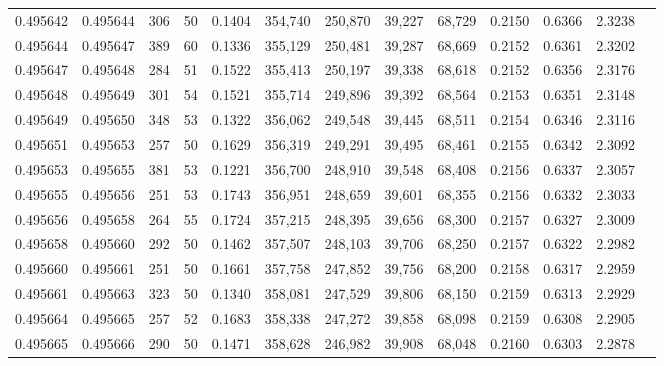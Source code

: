 \begin{tabular}{rrrrrrrrrrrrr}
0.495642 & 0.495644 &   306 &  50 &                                     0.1404 & 354,740 & 250,870 &  39,227 &  68,729 & 0.2150 & 0.6366 & 2.3238 \\
0.495644 & 0.495647 &   389 &  60 &                                     0.1336 & 355,129 & 250,481 &  39,287 &  68,669 & 0.2152 & 0.6361 & 2.3202 \\
0.495647 & 0.495648 &   284 &  51 &                                     0.1522 & 355,413 & 250,197 &  39,338 &  68,618 & 0.2152 & 0.6356 & 2.3176 \\
0.495648 & 0.495649 &   301 &  54 &                                     0.1521 & 355,714 & 249,896 &  39,392 &  68,564 & 0.2153 & 0.6351 & 2.3148 \\
0.495649 & 0.495650 &   348 &  53 &                                     0.1322 & 356,062 & 249,548 &  39,445 &  68,511 & 0.2154 & 0.6346 & 2.3116 \\
0.495651 & 0.495653 &   257 &  50 &                                     0.1629 & 356,319 & 249,291 &  39,495 &  68,461 & 0.2155 & 0.6342 & 2.3092 \\
0.495653 & 0.495655 &   381 &  53 &                                     0.1221 & 356,700 & 248,910 &  39,548 &  68,408 & 0.2156 & 0.6337 & 2.3057 \\
0.495655 & 0.495656 &   251 &  53 &                                     0.1743 & 356,951 & 248,659 &  39,601 &  68,355 & 0.2156 & 0.6332 & 2.3033 \\
0.495656 & 0.495658 &   264 &  55 &                                     0.1724 & 357,215 & 248,395 &  39,656 &  68,300 & 0.2157 & 0.6327 & 2.3009 \\
0.495658 & 0.495660 &   292 &  50 &                                     0.1462 & 357,507 & 248,103 &  39,706 &  68,250 & 0.2157 & 0.6322 & 2.2982 \\
0.495660 & 0.495661 &   251 &  50 &                                     0.1661 & 357,758 & 247,852 &  39,756 &  68,200 & 0.2158 & 0.6317 & 2.2959 \\
0.495661 & 0.495663 &   323 &  50 &                                     0.1340 & 358,081 & 247,529 &  39,806 &  68,150 & 0.2159 & 0.6313 & 2.2929 \\
0.495664 & 0.495665 &   257 &  52 &                                     0.1683 & 358,338 & 247,272 &  39,858 &  68,098 & 0.2159 & 0.6308 & 2.2905 \\
0.495665 & 0.495666 &   290 &  50 &                                     0.1471 & 358,628 & 246,982 &  39,908 &  68,048 & 0.2160 & 0.6303 & 2.2878 \\

\end{tabular}
